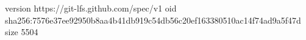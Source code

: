 version https://git-lfs.github.com/spec/v1
oid sha256:7576e37ee92950b8aa4b41db919c54db56c20ef163380510ac14f74ad9a5f47d
size 5504
